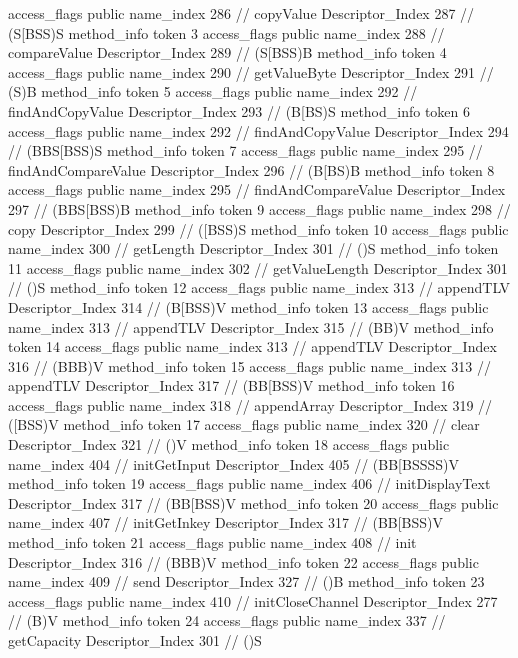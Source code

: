{{{{{					access_flags	public
					name_index	286		// copyValue
					Descriptor_Index	287		// (S[BSS)S
				}
				method_info {
					token	3
					access_flags	public
					name_index	288		// compareValue
					Descriptor_Index	289		// (S[BSS)B
				}
				method_info {
					token	4
					access_flags	public
					name_index	290		// getValueByte
					Descriptor_Index	291		// (S)B
				}
				method_info {
					token	5
					access_flags	public
					name_index	292		// findAndCopyValue
					Descriptor_Index	293		// (B[BS)S
				}
				method_info {
					token	6
					access_flags	public
					name_index	292		// findAndCopyValue
					Descriptor_Index	294		// (BBS[BSS)S
				}
				method_info {
					token	7
					access_flags	public
					name_index	295		// findAndCompareValue
					Descriptor_Index	296		// (B[BS)B
				}
				method_info {
					token	8
					access_flags	public
					name_index	295		// findAndCompareValue
					Descriptor_Index	297		// (BBS[BSS)B
				}
				method_info {
					token	9
					access_flags	public
					name_index	298		// copy
					Descriptor_Index	299		// ([BSS)S
				}
				method_info {
					token	10
					access_flags	public
					name_index	300		// getLength
					Descriptor_Index	301		// ()S
				}
				method_info {
					token	11
					access_flags	public
					name_index	302		// getValueLength
					Descriptor_Index	301		// ()S
				}
				method_info {
					token	12
					access_flags	public
					name_index	313		// appendTLV
					Descriptor_Index	314		// (B[BSS)V
				}
				method_info {
					token	13
					access_flags	public
					name_index	313		// appendTLV
					Descriptor_Index	315		// (BB)V
				}
				method_info {
					token	14
					access_flags	public
					name_index	313		// appendTLV
					Descriptor_Index	316		// (BBB)V
				}
				method_info {
					token	15
					access_flags	public
					name_index	313		// appendTLV
					Descriptor_Index	317		// (BB[BSS)V
				}
				method_info {
					token	16
					access_flags	public
					name_index	318		// appendArray
					Descriptor_Index	319		// ([BSS)V
				}
				method_info {
					token	17
					access_flags	public
					name_index	320		// clear
					Descriptor_Index	321		// ()V
				}
				method_info {
					token	18
					access_flags	public
					name_index	404		// initGetInput
					Descriptor_Index	405		// (BB[BSSSS)V
				}
				method_info {
					token	19
					access_flags	public
					name_index	406		// initDisplayText
					Descriptor_Index	317		// (BB[BSS)V
				}
				method_info {
					token	20
					access_flags	public
					name_index	407		// initGetInkey
					Descriptor_Index	317		// (BB[BSS)V
				}
				method_info {
					token	21
					access_flags	public
					name_index	408		// init
					Descriptor_Index	316		// (BBB)V
				}
				method_info {
					token	22
					access_flags	public
					name_index	409		// send
					Descriptor_Index	327		// ()B
				}
				method_info {
					token	23
					access_flags	public
					name_index	410		// initCloseChannel
					Descriptor_Index	277		// (B)V
				}
				method_info {
					token	24
					access_flags	public
					name_index	337		// getCapacity
					Descriptor_Index	301		// ()S
				}
			}
		}
	}
}
